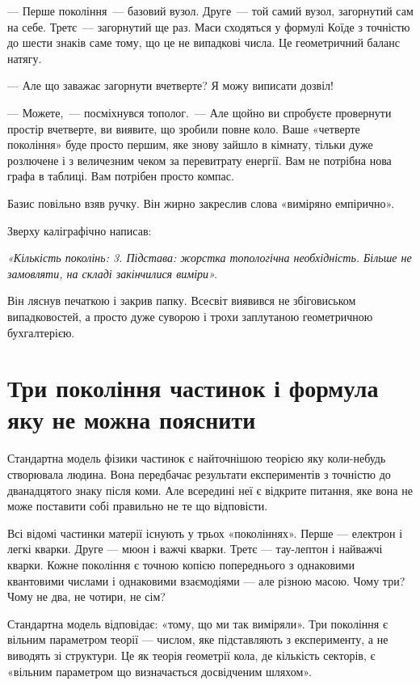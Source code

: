 \documentclass[12pt, a4paper, openany]{book}
\begin{document}
\begin{terrybox}
--- Перше покоління~--- базовий вузол. Друге~--- той самий вузол, загорнутий сам на себе. Третє~--- загорнутий ще раз. Маси сходяться у формулі Коїде з точністю до шести знаків саме тому, що це не випадкові числа. Це геометричний баланс натягу.

--- Але що заважає загорнути вчетверте? Я можу виписати дозвіл!

--- Можете,~--- посміхнувся тополог.~--- Але щойно ви спробуєте провернути простір вчетверте, ви виявите, що зробили повне коло. Ваше «четверте покоління» буде просто першим, яке знову зайшло в кімнату, тільки дуже розлючене і з величезним чеком за перевитрату енергії. Вам не потрібна нова графа в таблиці. Вам потрібен просто компас.

\medskip
Базис повільно взяв ручку. Він жирно закреслив слова «виміряно емпірично».

Зверху каліграфічно написав:

\medskip
\textit{«Кількість поколінь: 3. Підстава: жорстка топологічна необхідність. Більше не замовляти, на складі закінчилися виміри».}

Він ляснув печаткою і закрив папку. Всесвіт виявився не збіговиськом випадковостей, а просто дуже суворою і трохи заплутаною геометричною бухгалтерією.
\end{terrybox}

\chapter{Три покоління частинок і формула яку не можна пояснити}

Стандартна модель фізики частинок є найточнішою теорією яку коли-небудь створювала людина. Вона передбачає результати експериментів з точністю до дванадцятого знаку після коми. Але всередині неї є відкрите питання, яке вона не може поставити собі правильно не те що відповісти.

Всі відомі частинки матерії існують у трьох «поколіннях». Перше --- електрон і легкі кварки. Друге --- мюон і важчі кварки. Третє --- тау-лептон і найважчі кварки. Кожне покоління є точною копією попереднього з однаковими квантовими числами і однаковими взаємодіями --- але різною масою. Чому три? Чому не два, не чотири, не сім?

Стандартна модель відповідає: «тому, що ми так виміряли». Три покоління є вільним параметром теорії --- числом, яке підставляють з експерименту, а не виводять зі структури. Це як теорія геометрії кола, де кількість секторів, є «вільним параметром що визначається досвідченим шляхом».
\end{document}
